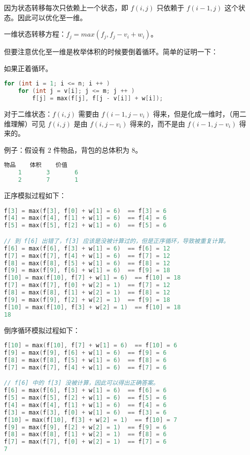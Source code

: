 因为状态转移每次只依赖上一个状态，即 $f(i, j)$ 只依赖于 $f(i - 1, j)$ 这个状态。因此可以优化至一维。

一维状态转移方程：$f_j = max(f_j, f_j - v_i + w_i)$。

但要注意优化至一维是枚举体积的时候要倒着循环。简单的证明一下：

如果正着循环。

\begin{lstlisting}[language=cpp]
for (int i = 1; i <= n; i ++ ) 
    for (int j = v[i]; j <= m; j ++ ) 
        f[j] = max(f[j], f[j - v[i]] + w[i]);
\end{lstlisting}

对于二维状态：$f(i, j)$ 需要由 $f(i - 1, j - v_i)$ 得来，但是化成一维时，（用二维理解）可见 $f(i, j)$ 是由 $f(i, j - v_i)$ 得来的，而不是由 $f(i - 1, j - v_i)$ 得来的。

例子：假设有 $2$ 件物品，背包的总体积为 $8$。

\begin{lstlisting}[language=cpp]
    物品    体积    价值
    1       3       6
    2       7       1
\end{lstlisting}

正序模拟过程如下：

\begin{lstlisting}[language=cpp]
f[3] = max(f[3], f[0] + w[1] = 6)  == f[3] = 6 
f[4] = max(f[4], f[1] + w[1] = 6)  == f[4] = 6 
f[5] = max(f[5], f[2] + w[1] = 6)  == f[5] = 6 

// 到 f[6] 出错了，f[3] 应该是没被计算过的，但是正序循环，导致被重复计算。
f[6] = max(f[6], f[3] + w[1] = 6)  == f[6] = 12
f[7] = max(f[7], f[4] + w[1] = 6)  == f[7] = 12 
f[8] = max(f[8], f[5] + w[1] = 6)  == f[8] = 12 
f[9] = max(f[9], f[6] + w[1] = 6)  == f[9] = 18 
f[10] = max(f[10], f[7] + w[1] = 6)  == f[10] = 18 
f[7] = max(f[7], f[0] + w[2] = 1)  == f[7] = 12 
f[8] = max(f[8], f[1] + w[2] = 1)  == f[8] = 12 
f[9] = max(f[9], f[2] + w[2] = 1)  == f[9] = 18 
f[10] = max(f[10], f[3] + w[2] = 1)  == f[10] = 18 
18
\end{lstlisting}

倒序循环模拟过程如下：

\begin{lstlisting}[language=cpp]
f[10] = max(f[10], f[7] + w[1] = 6)  == f[10] = 6 
f[9] = max(f[9], f[6] + w[1] = 6)  == f[9] = 6 
f[8] = max(f[8], f[5] + w[1] = 6)  == f[8] = 6 
f[7] = max(f[7], f[4] + w[1] = 6)  == f[7] = 6 

// f[6] 中的 f[3] 没被计算，因此可以得出正确答案。
f[6] = max(f[6], f[3] + w[1] = 6)  == f[6] = 6 
f[5] = max(f[5], f[2] + w[1] = 6)  == f[5] = 6 
f[4] = max(f[4], f[1] + w[1] = 6)  == f[4] = 6 
f[3] = max(f[3], f[0] + w[1] = 6)  == f[3] = 6 
f[10] = max(f[10], f[3] + w[2] = 1)  == f[10] = 7 
f[9] = max(f[9], f[2] + w[2] = 1)  == f[9] = 6 
f[8] = max(f[8], f[1] + w[2] = 1)  == f[8] = 6 
f[7] = max(f[7], f[0] + w[2] = 1)  == f[7] = 6 
7
\end{lstlisting}

